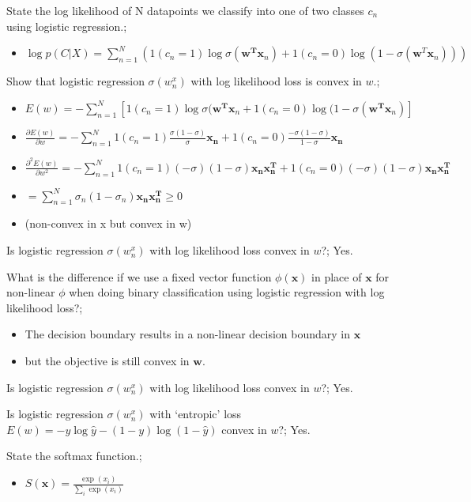 \documentclass{article}
\begin{document}
State the log likelihood of N datapoints we classify into one of two classes $c_n$ using logistic regression.; \begin{itemize}
    \item $\log p(C|X) = \sum_{n=1}^N (1(c_n = 1)\log \sigma(\bm{w^Tx}_n) + 1(c_n = 0)\log (1-\sigma(\bm{w}^T\bm{x}_n)))$
\end{itemize}

Show that logistic regression $\sigma(w^x_n)$ with log likelihood loss is convex in $w$.; \begin{itemize}
    \item $E(w)=-\sum_{n=1}^N [1(c_n=1)\log \sigma(\mathbf{w^Tx}_n + 1(c_n=0)\log(1-\sigma(\mathbf{w^Tx}_n)]$
    \item $\frac{\partial E(w)}{\partial w} = -\sum_{n=1}^N 1(c_n=1)\frac{\sigma(1-\sigma)}{\sigma}\mathbf{x_n} + 1(c_n=0)\frac{-\sigma(1-\sigma)}{1-\sigma}\mathbf{x_n}$
    \item $\frac{\partial^2E(w)}{\partial w^2} = -\sum_{n=1}^N 1(c_n = 1)(-\sigma)(1-\sigma)\mathbf{x_nx_n^T}+1(c_n=0)(-\sigma)(1-\sigma)\mathbf{x_nx_n^T}$
    \item $=\sum_{n=1}^N \sigma_n(1-\sigma_n)\mathbf{x_nx_n^T}\geq 0$
    \item (non-convex in x but convex in w)
\end{itemize}

Is logistic regression $\sigma(w^x_n)$ with log likelihood loss convex in $w$?; Yes.

What is the difference if we use a fixed vector function $\phi(\bm{x})$ in place of $\bm{x}$ for non-linear $\phi$ when doing binary classification using logistic regression with log likelihood loss?; \begin{itemize} \item The decision boundary results in a non-linear decision boundary in $\bm{x}$ \item but the objective is still convex in $\bm{w}$. \end{itemize}

Is logistic regression $\sigma(w^x_n)$ with log likelihood loss convex in $w$?; Yes.

Is logistic regression $\sigma(w^x_n)$ with `entropic' loss $E(w) = -y\log\hat{y} - (1-y)\log(1-\hat{y})$ convex in $w$?; Yes.

State the softmax function.; \begin{itemize}
    \item $S(\bm{x}) = \frac{\exp(x_i)}{\sum_i \exp(x_i)}$
\end{itemize}
\end{document}
